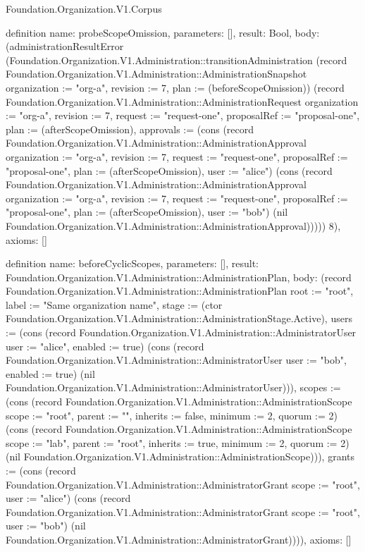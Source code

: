 \begin{lexlean}{Foundation.Organization.V1.Corpus}
\begin{semanticmodule}
definition{
  name: probeScopeOmission,
  parameters: [],
  result: Bool,
  body: (administrationResultError (Foundation.Organization.V1.Administration::transitionAdministration (record Foundation.Organization.V1.Administration::AdministrationSnapshot {organization := "org-a", revision := 7, plan := (beforeScopeOmission)}) (record Foundation.Organization.V1.Administration::AdministrationRequest {organization := "org-a", revision := 7, request := "request-one", proposalRef := "proposal-one", plan := (afterScopeOmission), approvals := (cons (record Foundation.Organization.V1.Administration::AdministrationApproval {organization := "org-a", revision := 7, request := "request-one", proposalRef := "proposal-one", plan := (afterScopeOmission), user := "alice"}) (cons (record Foundation.Organization.V1.Administration::AdministrationApproval {organization := "org-a", revision := 7, request := "request-one", proposalRef := "proposal-one", plan := (afterScopeOmission), user := "bob"}) (nil Foundation.Organization.V1.Administration::AdministrationApproval)))})) 8),
  axioms: []
}

definition{
  name: beforeCyclicScopes,
  parameters: [],
  result: Foundation.Organization.V1.Administration::AdministrationPlan,
  body: (record Foundation.Organization.V1.Administration::AdministrationPlan {root := "root", label := "Same organization name", stage := (ctor Foundation.Organization.V1.Administration::AdministrationStage.Active), users := (cons (record Foundation.Organization.V1.Administration::AdministratorUser {user := "alice", enabled := true}) (cons (record Foundation.Organization.V1.Administration::AdministratorUser {user := "bob", enabled := true}) (nil Foundation.Organization.V1.Administration::AdministratorUser))), scopes := (cons (record Foundation.Organization.V1.Administration::AdministrationScope {scope := "root", parent := "", inherits := false, minimum := 2, quorum := 2}) (cons (record Foundation.Organization.V1.Administration::AdministrationScope {scope := "lab", parent := "root", inherits := true, minimum := 2, quorum := 2}) (nil Foundation.Organization.V1.Administration::AdministrationScope))), grants := (cons (record Foundation.Organization.V1.Administration::AdministratorGrant {scope := "root", user := "alice"}) (cons (record Foundation.Organization.V1.Administration::AdministratorGrant {scope := "root", user := "bob"}) (nil Foundation.Organization.V1.Administration::AdministratorGrant)))}),
  axioms: []
}


\end{semanticmodule}
\end{lexlean}
